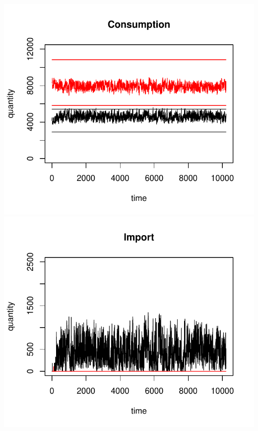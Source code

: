 \documentclass{article}
\begin{document}
\vskip2mm
\hskip-1cm
\includegraphics[scale=0.5]{fig_case03_consumption}
\includegraphics[scale=0.5]{fig_case03_import}
\end{document}
